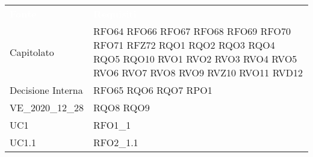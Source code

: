 \renewcommand{\arraystretch}{1.5}


\begin{longtable}{C{6cm} C{6cm}} 
	
	\textcolor{white}{\textbf{Fonte}}&
	\textcolor{white}{\textbf{Requisiti}}\\	

	Capitolato & RFO64 \newline RFO66 \newline RFO67 \newline RFO68 \newline RFO69 \newline RFO70 \newline RFO71 \newline RFZ72 \newline RQO1 \newline RQO2 \newline RQO3 \newline RQO4 \newline RQO5 \newline RQO10 \newline RVO1 \newline RVO2 \newline RVO3 \newline RVO4 \newline RVO5 \newline RVO6 \newline RVO7 \newline RVO8 \newline RVO9 \newline RVZ10 \newline RVO11 \newline RVD12 \\
	
	Decisione Interna & RFO65 \newline RQO6 \newline RQO7 \newline RPO1  \\
	
	VE\_2020\_12\_28 & RQO8 \newline RQO9  \\

	UC1 & RFO1\_1 \\

	UC1.1 & RFO2\_1.1 \\
	

\end{longtable}
